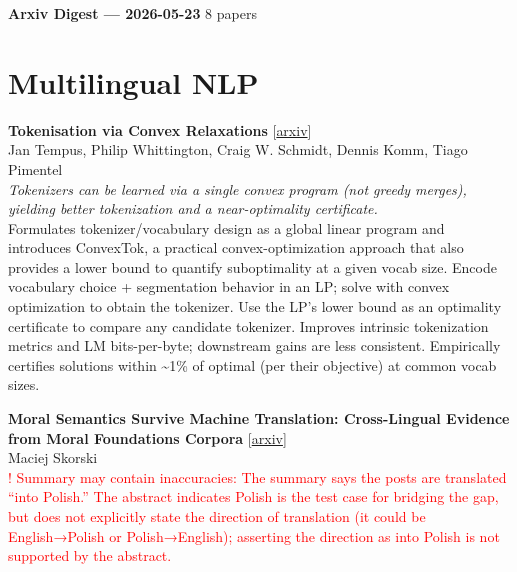 \documentclass[12pt,letterpaper]{article}
\begin{document}
{\footnotesize\textbf{Arxiv Digest --- 2026-05-23} \hfill 8 papers}

\smallskip

\section*{Multilingual NLP}

{\small\textbf{Tokenisation via Convex Relaxations}} {\scriptsize[\href{https://arxiv.org/abs/2605.22821}{arxiv}]}\\
{\scriptsize Jan Tempus, Philip Whittington, Craig W. Schmidt, Dennis Komm, Tiago Pimentel}\\

{\small\textit{Tokenizers can be learned via a single convex program (not greedy merges), yielding better tokenization and a near-optimality certificate.}}\\[1pt]
{\footnotesize Formulates tokenizer/vocabulary design as a global linear program and introduces ConvexTok, a practical convex-optimization approach that also provides a lower bound to quantify suboptimality at a given vocab size. Encode vocabulary choice + segmentation behavior in an LP; solve with convex optimization to obtain the tokenizer. Use the LP's lower bound as an optimality certificate to compare any candidate tokenizer. Improves intrinsic tokenization metrics and LM bits-per-byte; downstream gains are less consistent. Empirically certifies solutions within \textasciitilde{}1\% of optimal (per their objective) at common vocab sizes.}

\medskip

{\small\textbf{Moral Semantics Survive Machine Translation: Cross-Lingual Evidence from Moral Foundations Corpora}} {\scriptsize[\href{https://arxiv.org/abs/2605.22660}{arxiv}]}\\
{\scriptsize Maciej Skorski}\\

{\scriptsize\textcolor{red}{! Summary may contain inaccuracies: The summary says the posts are translated ``into Polish.'' The abstract indicates Polish is the test case for bridging the gap, but does not explicitly state the direction of translation (it could be English→Polish or Polish→English); asserting the direction as into Polish is not supported by the abstract.}}\\[1pt]
\end{document}
